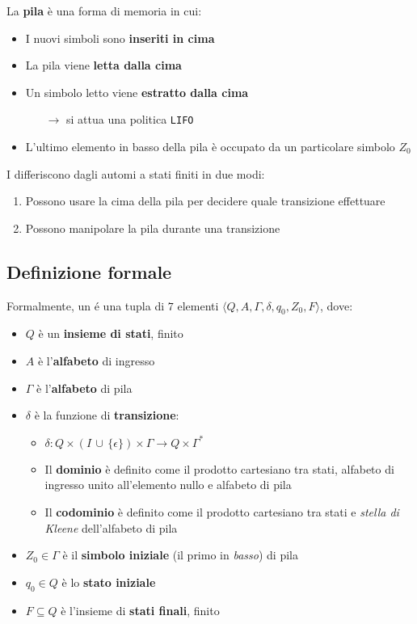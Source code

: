 \documentclass[italian, 10pt]{article}
\begin{document}
La \textbf{pila} è una forma di memoria in cui:

\begin{itemize}
  \item I nuovi simboli sono \textbf{inseriti in cima}
  \item La pila viene \textbf{letta dalla cima}
  \item Un simbolo letto viene \textbf{estratto dalla cima}
        \begin{itemize}
          \item[\(\rightarrow\)] si attua una politica \texttt{LIFO}
        \end{itemize}
  \item L'ultimo elemento in basso della pila è occupato da un particolare simbolo \(Z_0\)
\end{itemize}

I \PDA differiscono dagli automi a stati finiti in due modi:

\begin{enumerate}
  \item Possono usare la cima della pila per decidere quale transizione effettuare
  \item Possono manipolare la pila durante una transizione
\end{enumerate}

\subsection{Definizione formale \PDA}
\label{sec:definizione-formale-PDA}

Formalmente, un \PDA é una tupla di \(7\) elementi \( \langle Q, A, \Gamma, \delta, q_0, Z_0, F \rangle \), dove:

\begin{itemize}
  \item \(Q\) è un \textbf{insieme di stati}, finito
  \item \(A\) è l'\textbf{alfabeto} di ingresso
  \item \(\Gamma\) è l'\textbf{alfabeto} di pila
  \item \(\delta\) è la funzione di \textbf{transizione}:
        \begin{itemize}
          \item \(\delta: Q \times \left(I \, \cup \, \{\epsilon\} \right) \times \Gamma \rightarrow Q \times \Gamma^\ast\)
          \item Il \textbf{dominio} è definito come il prodotto cartesiano tra stati, alfabeto di ingresso unito all'elemento nullo e alfabeto di pila
          \item Il \textbf{codominio} è definito come il prodotto cartesiano tra stati e \textit{stella di Kleene} dell'alfabeto di pila
        \end{itemize}
  \item \(Z_0 \in \Gamma\) è il \textbf{simbolo iniziale} (il primo in \textit{basso}) di pila
  \item \(q_0 \in Q\) è lo \textbf{stato iniziale}
  \item \(F \subseteq Q\) è l'insieme di \textbf{stati finali}, finito
\end{itemize}
\end{document}
